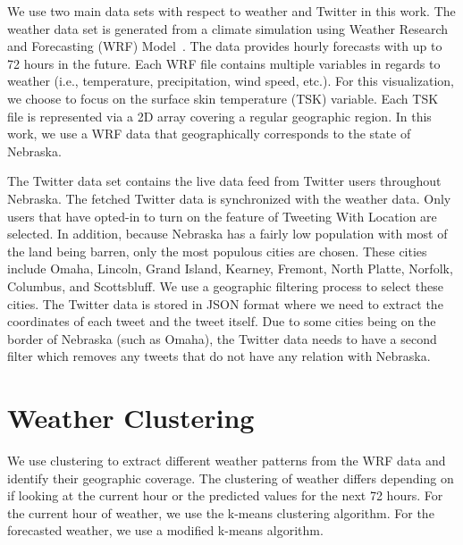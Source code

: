 We use two main data sets with respect to weather and Twitter in this work. The weather data set is generated from a climate simulation using Weather Research and Forecasting (WRF) Model~\cite{Michalakes2004}. %
The data provides hourly forecasts with up to 72 hours in the future. Each WRF file contains multiple variables in regards to weather (i.e., temperature, precipitation, wind speed, etc.). For this visualization, we choose to focus on the surface skin temperature (TSK) variable. Each TSK file is represented via a 2D array %
covering a regular geographic region. In this work, we use a WRF data that geographically corresponds to the state of Nebraska.

The Twitter data set contains the live data feed from Twitter users throughout Nebraska. The fetched Twitter data is synchronized with the weather data. Only users that have opted-in to turn on the feature of Tweeting With Location are selected. In addition, because Nebraska has a fairly low population with most of the land being barren, only the most populous cities are chosen. These cities include Omaha, Lincoln, Grand Island, Kearney, Fremont, North Platte, Norfolk, Columbus, and Scottsbluff. We use a geographic filtering process to select these cities. The Twitter data is stored in JSON format where we need to extract the coordinates of each tweet and the tweet itself. Due to some cities being on the border of Nebraska (such as Omaha), the Twitter data needs to have a second filter which removes any tweets that do not have any relation with Nebraska.


\section{Weather Clustering}
\label{sec:clust}

We use clustering to extract different weather patterns from the WRF data and identify their geographic coverage. The clustering of weather differs depending on if looking at the current hour or the predicted values for the next 72 hours. For the current hour of weather, we use the k-means clustering algorithm. For the forecasted weather, we use a modified k-means algorithm.

